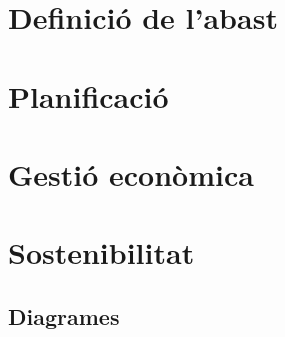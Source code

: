 \documentclass[a4paper,12pt]{report}
\begin{document}
	\chapter{Definició de l'abast}
	
	\chapter{Planificació}
	
	\chapter{Gestió econòmica}
	
	\chapter{Sostenibilitat}
	
	
	
	\begin{appendices}
		\chapter{Diagrames}
		\label{appendix:diagrames}
		
	\end{appendices}

	\printbibliography[heading=bibintoc]
	\cleardoublepage{}
	\listoftables
	\cleardoublepage{}
	\listoffigures
	
	
\end{document}
